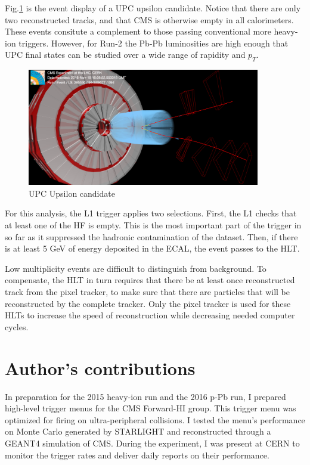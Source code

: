 Fig.\ref{fig:eventdisplayUPCUps} is the event display of a UPC upsilon candidate. Notice that there are only two reconstructed tracks, and that CMS is otherwise empty in all calorimeters. These events consitute a complement to those passing conventional more heavy-ion triggers. However, for Run-2 the Pb-Pb luminosities are high enough that UPC final states can be studied over a wide range of rapidity and $p_T$.

\begin{figure}[h!]
\begin{centering}
\includegraphics[width=4in]{Chapter3/importfigs/upcJpsi_run285530_lumi594_event944509077_v0.png}
\par\end{centering}
\caption{UPC Upsilon candidate \label{fig:eventdisplayUPCUps}}
\end{figure}

For this analysis, the L1 trigger applies two selections. First, the L1 checks that at least one of the HF is empty. This is the most important part of the trigger in so far as it suppressed the hadronic contamination of the dataset. Then, if there is at least 5 GeV of energy deposited in the ECAL, the event passes to the HLT. 

Low multiplicity events are difficult to distinguish from background. To compensate, the HLT in turn requires that there be at least once reconstructed track from the pixel tracker, to make sure that there are particles that will be reconstructed by the complete tracker. Only the pixel tracker is used for these HLTs to increase the speed of reconstruction while decreasing needed computer cycles. 

\section{Author's contributions}

In preparation for the 2015 heavy-ion run and the 2016 p-Pb run, I prepared high-level trigger menus for the CMS Forward-HI group. This trigger menu was optimized for firing on ultra-peripheral collisions. I tested the menu's performance on Monte Carlo generated by STARLIGHT and reconstructed through a GEANT4 simulation of CMS. During the experiment, I was present at CERN to monitor the trigger rates and deliver daily reports on their performance. 


